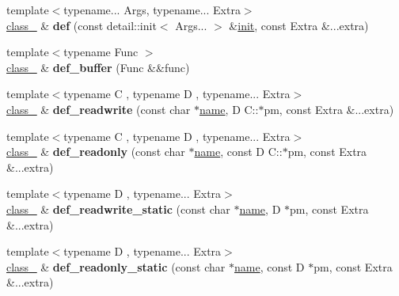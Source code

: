 \begin{DoxyCompactItemize}
\item 
{\footnotesize template$<$typename... Args, typename... Extra$>$ }\\\hyperlink{classclass__}{class\+\_\+} \& {\bfseries def} (const detail\+::init$<$ Args... $>$ \&\hyperlink{structinit}{init}, const Extra \&...extra)\hypertarget{classclass___a299becdbb4bb40a1b40f2c38ef967531}{}\label{classclass___a299becdbb4bb40a1b40f2c38ef967531}

\item 
{\footnotesize template$<$typename Func $>$ }\\\hyperlink{classclass__}{class\+\_\+} \& {\bfseries def\+\_\+buffer} (Func \&\&func)\hypertarget{classclass___ae4c961b7a308f541e913db5d5f905195}{}\label{classclass___ae4c961b7a308f541e913db5d5f905195}

\item 
{\footnotesize template$<$typename C , typename D , typename... Extra$>$ }\\\hyperlink{classclass__}{class\+\_\+} \& {\bfseries def\+\_\+readwrite} (const char $\ast$\hyperlink{structname}{name}, D C\+::$\ast$pm, const Extra \&...extra)\hypertarget{classclass___a8c5d3c7eae54f53082c4f22ec74e7bbc}{}\label{classclass___a8c5d3c7eae54f53082c4f22ec74e7bbc}

\item 
{\footnotesize template$<$typename C , typename D , typename... Extra$>$ }\\\hyperlink{classclass__}{class\+\_\+} \& {\bfseries def\+\_\+readonly} (const char $\ast$\hyperlink{structname}{name}, const D C\+::$\ast$pm, const Extra \&...extra)\hypertarget{classclass___a543a81e183fc9f004b61ac177cea5929}{}\label{classclass___a543a81e183fc9f004b61ac177cea5929}

\item 
{\footnotesize template$<$typename D , typename... Extra$>$ }\\\hyperlink{classclass__}{class\+\_\+} \& {\bfseries def\+\_\+readwrite\+\_\+static} (const char $\ast$\hyperlink{structname}{name}, D $\ast$pm, const Extra \&...extra)\hypertarget{classclass___aa92a77a8c44fb25ddc154ebdfee53dd6}{}\label{classclass___aa92a77a8c44fb25ddc154ebdfee53dd6}

\item 
{\footnotesize template$<$typename D , typename... Extra$>$ }\\\hyperlink{classclass__}{class\+\_\+} \& {\bfseries def\+\_\+readonly\+\_\+static} (const char $\ast$\hyperlink{structname}{name}, const D $\ast$pm, const Extra \&...extra)\hypertarget{classclass___a608269129c33d7f524e94096382efdb6}{}\label{classclass___a608269129c33d7f524e94096382efdb6}


\end{DoxyCompactItemize}
